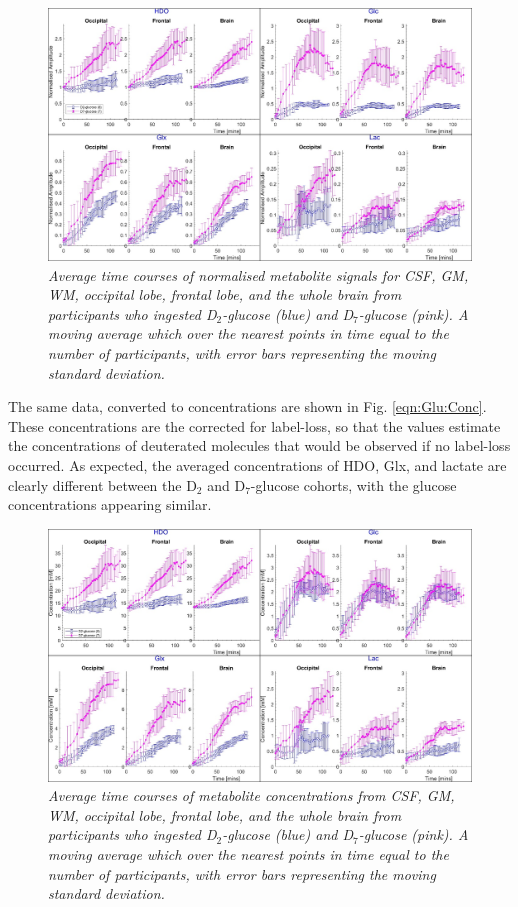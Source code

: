 \begin{figure}
    \centering
    \includegraphics[width = 1\textwidth]{Figures/Glucose/Avg_Amp.png}
    \caption{\textit{Average time courses of normalised metabolite signals for \ac{CSF}, \ac{GM}, \ac{WM}, occipital lobe, frontal lobe, and the whole brain from participants who ingested D$_2$-glucose (blue) and D$_7$-glucose (pink). A moving average which over the nearest points in time equal to the number of participants, with error bars representing the moving standard deviation.}}
    \label{fig:Glu:Avg_Amp}
\end{figure}

The same data, converted to concentrations are shown in Fig. \ref{eqn:Glu:Conc}. These concentrations are the corrected for label-loss, so that the values estimate the concentrations of deuterated molecules that would be observed if no label-loss occurred. As expected, the averaged concentrations of \ac{HDO}, Glx, and lactate are clearly different between the D$_2$ and D$_7$-glucose cohorts, with the glucose concentrations appearing similar. 

\begin{figure}
    \centering
    \includegraphics[width = 1\textwidth]{Figures/Glucose/Avg_Conc.png}
    \caption{\textit{Average time courses of metabolite concentrations from \ac{CSF}, \ac{GM}, \ac{WM}, occipital lobe, frontal lobe, and the whole brain from participants who ingested D$_2$-glucose (blue) and D$_7$-glucose (pink). A moving average which over the nearest points in time equal to the number of participants, with error bars representing the moving standard deviation.}}
    \label{fig:Glu:Avg_Conc}
\end{figure}

